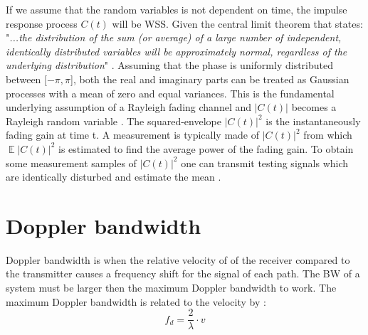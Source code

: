 If we assume that the random variables is not dependent on time, the impulse response process $C(t)$ will be \gls{WSS}. Given the central limit theorem that states:
"\textit{...the distribution of the sum (or average) of a large number of independent, identically distributed variables will be approximately normal, regardless of the underlying distribution}" \citep{CentralLimit}.  
Assuming that the phase is uniformly distributed between [$-\pi,\pi$], both the real and imaginary parts can be treated as Gaussian processes with a mean of zero and equal variances. This is the fundamental underlying assumption of a Rayleigh fading channel and $ \left | C(t) \right | $ becomes a Rayleigh random variable \citep[p. 589]{Wireless_CommunicationsBook}. The squared-envelope $ \left | C(t) \right |^2 $ is the instantaneously fading gain at time t. A measurement is typically made of $ \left | C(t) \right |^2 $ from which $ \mathop{\mathbb{E}}\left | C(t) \right |^2 $ is estimated to find the average power of the fading gain. To obtain some measurement samples of $ \left | C(t) \right |^2 $ one can transmit testing signals which are identically disturbed and estimate the mean \citep{MeasurementComplexRay}.




\section{Doppler bandwidth}
Doppler bandwidth is when the relative velocity of of the receiver compared to the transmitter causes a frequency shift for the signal of each path. The \gls{BW} of a system must be larger then the maximum Doppler bandwidth to work. The maximum Doppler bandwidth is related to the velocity by \citep[p. 229]{Wireless_CommunicationsBook}:
\begin{equation}\label{eq:Doppler}
f_d = \frac{2}{\lambda} \cdot v
\end{equation}
\begin{where}
\end{where}

